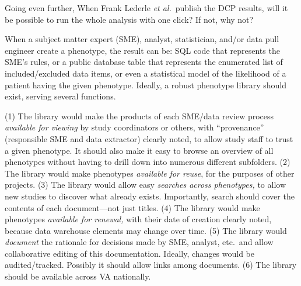 \documentclass{tufte-handout}
\begin{document}
Going even further, When Frank Lederle \emph{et al.}\ publish the DCP
results, will it be possible to run the whole analysis with one click?
If not, why not?


When a subject matter expert (SME), analyst, statistician, and/or data
pull engineer create a phenotype, the result can be: SQL code that
represents the SME's rules, or a public database table that represents
the enumerated list of included/excluded data items, or even a
statistical model of the likelihood of a patient having the given
phenotype. Ideally, a robust phenotype library should exist, serving
several functions.

(1) The library would make the products of each SME/data review
process \emph{available for viewing} by study coordinators or others,
with ``provenance'' (responsible SME and data extractor) clearly
noted, to allow study staff to trust a given phenotype. It should also
make it easy to browse an overview of all phenotypes without having to
drill down into numerous different subfolders. (2) The library would
make phenotypes \emph{available for reuse}, for the purposes of other
projects. (3) The library would allow easy \emph{searches across
  phenotypes,} to allow new studies to discover what already exists.
Importantly, search should cover the contents of each document---not
just titles. (4) The library would make phenotypes \emph{available for
  renewal,} with their date of creation clearly noted, because data
warehouse elements may change over time. (5) The library would
\emph{document} the rationale for decisions made by SME, analyst,
etc.\ and allow collaborative editing of this documentation. Ideally,
changes would be audited/tracked. Possibly it should allow links among
documents. (6) The library should be available across VA nationally.
\end{document}
